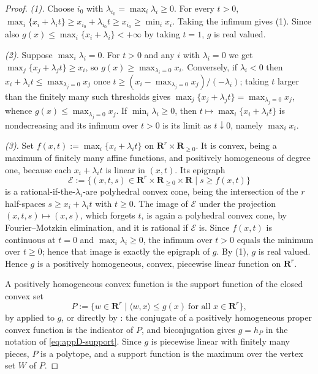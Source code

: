 \begin{proof}
\emph{(1).}  Choose $i_0$ with $\lambda_{i_0}=\max_i\lambda_i\geq0$.
For every $t>0$,
$\max_i\{x_i+\lambda_it\}\geq x_{i_0}+\lambda_{i_0}t\geq x_{i_0}\geq\min_ix_i$.
Taking the infimum gives (1).  Since also
$g(x)\leq\max_i\{x_i+\lambda_i\}<+\infty$ by taking $t=1$, $g$ is real
valued.

\emph{(2).}  Suppose $\max_i\lambda_i=0$.  For $t>0$ and any $i$ with
$\lambda_i=0$ we get $\max_j\{x_j+\lambda_jt\}\geq x_i$, so
$g(x)\geq\max_{\lambda_i=0}x_i$.  Conversely, if $\lambda_i<0$ then
$x_i+\lambda_it\leq\max_{\lambda_j=0}x_j$ once
$t\geq(x_i-\max_{\lambda_j=0}x_j)/(-\lambda_i)$; taking $t$ larger than
the finitely many such thresholds gives
$\max_j\{x_j+\lambda_jt\}=\max_{\lambda_j=0}x_j$, whence
$g(x)\leq\max_{\lambda_j=0}x_j$.  If $\min_i\lambda_i\geq0$, then
$t\mapsto\max_i\{x_i+\lambda_it\}$ is nondecreasing and its infimum over
$t>0$ is its limit as $t\downarrow0$, namely $\max_ix_i$.

\emph{(3).}  Set
$f(x,t):=\max_i\{x_i+\lambda_it\}$ on
$\mathbf R^r\times\mathbf R_{\geq0}$.  It is convex, being a maximum of
finitely many affine functions, and positively homogeneous of degree one,
because each $x_i+\lambda_it$ is linear in $(x,t)$.  Its epigraph
\[
 \mathcal E:=\{(x,t,s)\in\mathbf R^r\times\mathbf R_{\geq0}\times\mathbf R
 \mid s\geq f(x,t)\}
\]
is a rational-if-the-$\lambda_i$-are polyhedral convex cone, being the
intersection of the $r$ half-spaces $s\geq x_i+\lambda_it$ with
$t\geq0$.  The image of $\mathcal E$ under the projection
$(x,t,s)\mapsto(x,s)$, which forgets $t$, is again a polyhedral convex
cone, by Fourier--Motzkin elimination, and it is rational if
$\mathcal E$ is.  Since $f(x,t)$ is continuous at $t=0$ and
$\max_i\lambda_i\geq0$, the infimum over $t>0$ equals the minimum over
$t\geq0$; hence that image is exactly the epigraph of $g$.  By (1),
$g$ is real valued.  Hence $g$ is a positively homogeneous, convex,
piecewise linear function on $\mathbf R^r$.

A positively homogeneous convex function is the support function of the
closed convex set
\[
 P:=\{w\in\mathbf R^r\mid\langle w,x\rangle\leq g(x)
 \ \text{for all }x\in\mathbf R^r\},
\]
by  applied to $g$, or directly by
: the conjugate of a positively homogeneous
proper convex function is the indicator of $P$, and biconjugation gives
$g=h_P$ in the notation of \eqref{eq:appD-support}.  Since $g$ is
piecewise linear with finitely many pieces, $P$ is a polytope, and a
support function is the maximum over the vertex set $W$ of $P$.


\end{proof}
